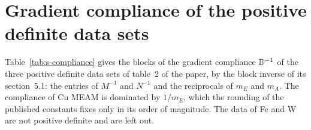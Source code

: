 \section{Gradient compliance of the positive definite data sets}\label{sup:compliance}

Table~\ref{tab:s-compliance} gives the blocks of the gradient compliance $\mathbb{D}^{-1}$ of the
three positive definite data sets of table~2 of the paper, by the block inverse of
its section~5.1: the entries of $M^{-1}$ and $N^{-1}$ and the reciprocals of $m_E$ and
$m_A$. The compliance of Cu MEAM is dominated by $1/m_E$, which the rounding of the
published constants fixes only in its order of magnitude. The data of Fe and W are not
positive definite and are left out.

\begin{table}[pos=htbp]
\caption{Blocks of the gradient compliance (\AA/eV) of the positive definite data sets
of table~2 of the paper, by eq.~(25) of the paper. The rule of digits is that of that
table; $\dagger$ marks an entry whose relative rounding uncertainty exceeds 1\,\%.}\label{tab:s-compliance}
\centering\small

\end{table}

